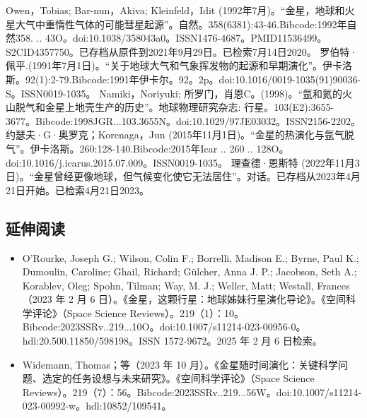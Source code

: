 \begin{enumerate}
 Owen，Tobias; Bar-nun，Akiva; Kleinfeld，Idit (1992年7月)。“金星，地球和火星大气中重惰性气体的可能彗星起源”。自然。358(6381):43-46.Bibcode:1992年自然358. .. 43O。doi:10.1038/358043a0。ISSN1476-4687。PMID11536499。S2CID4357750。已存档从原件到2021年9月29日。已检索7月14日2020。   
 罗伯特·佩平.(1991年7月1日)。“关于地球大气和气象挥发物的起源和早期演化”。伊卡洛斯。92(1):2-79.Bibcode:1991年伊卡尔。92。2p。doi:10.1016/0019-1035(91)90036-S。ISSN0019-1035。 
 Namiki，Noriyuki; 所罗门，肖恩C。(1998)。“氩和氦的火山脱气和金星上地壳生产的历史”。地球物理研究杂志: 行星。103(E2):3655-3677。Bibcode:1998JGR...103.3655N。doi:10.1029/97JE03032。ISSN2156-2202。 
 约瑟夫·G·奥罗克；Korenaga，Jun (2015年11月1日)。“金星的热演化与氩气脱气”。伊卡洛斯。260:128-140.Bibcode:2015年Icar .. 260 .. 128O。doi:10.1016/j.icarus.2015.07.009。ISSN0019-1035。 
 理查德·恩斯特 (2022年11月3日)。“金星曾经更像地球，但气候变化使它无法居住”。对话。已存档从2023年4月21日开始。已检索4月21日2023。

\end{enumerate}
\subsection{延伸阅读}
\begin{itemize}
\item O'Rourke, Joseph G.; Wilson, Colin F.; Borrelli, Madison E.; Byrne, Paul K.; Dumoulin, Caroline; Ghail, Richard; Gülcher, Anna J. P.; Jacobson, Seth A.; Korablev, Oleg; Spohn, Tilman; Way, M. J.; Weller, Matt; Westall, Frances（2023 年 2 月 6 日）。《金星，这颗行星：地球姊妹行星演化导论》。《空间科学评论》（Space Science Reviews）。219（1）：10。Bibcode:2023SSRv..219...10O。doi:10.1007/s11214-023-00956-0。hdl:20.500.11850/598198。ISSN 1572-9672。2025 年 2 月 6 日检索。
\item Widemann, Thomas；等（2023 年 10 月）。《金星随时间演化：关键科学问题、选定的任务设想与未来研究》。《空间科学评论》（Space Science Reviews）。219（7）：56。Bibcode:2023SSRv..219...56W。doi:10.1007/s11214-023-00992-w。hdl:10852/109541。
\end{itemize}
